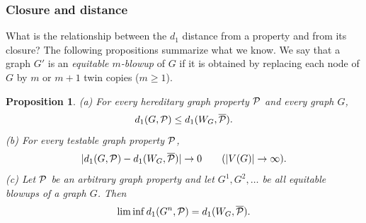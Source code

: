 \documentclass{article}
\newtheorem{prop}[theorem]{Proposition}
\begin{document}
\subsubsection{Closure and distance}

What is the relationship between the $d_1$ distance from a property
and from its closure? The following propositions summarize what we
know. We say that a graph $G'$ is an {\it equitable $m$-blowup} of
$G$ if it is obtained by replacing each node of $G$ by $m$ or $m+1$
twin copies ($m\ge 1$).

\begin{prop}\label{G2WG}
{\rm (a)}  For every hereditary graph property $\mathcal{P}$ and every graph
$G$,
\[
d_1(G,\mathcal{P})\le d_1(W_G,\overline{\mathcal{P}}).
\]
{\rm (b)} For every testable graph property $\mathcal{P}$,
\[
|d_1(G,\mathcal{P})-d_1(W_G,\overline{\mathcal{P}})|\to 0 \qquad (|V(G)|\to\infty).
\]
{\rm (c)} Let $\mathcal{P}$ be an arbitrary graph property and let $G^1,
G^2,\dots$ be all equitable blowups of a graph $G$. Then
\[
\liminf d_1(G^n,\mathcal{P}) = d_1(W_G,\overline{\mathcal{P}}).
\]
\end{prop}
\end{document}
